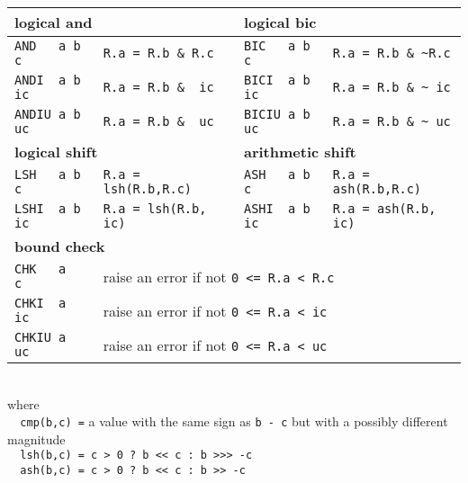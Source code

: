 \documentclass[10pt,a4paper]{article}
\begin{document}
\begin{tabular}{|l|l||l|l|}
\multicolumn{2}{|l||}{\bf logical and} & \multicolumn{2}{|l|}{\bf logical bic} \\ \hline
\verb#AND   a b  c# & \verb#R.a = R.b & R.c# &   \verb#BIC   a b  c# & \verb#R.a = R.b & ~R.c#   \\
\verb#ANDI  a b ic# & \verb#R.a = R.b &  ic# &   \verb#BICI  a b ic# & \verb#R.a = R.b & ~ ic#   \\
\verb#ANDIU a b uc# & \verb#R.a = R.b &  uc# &   \verb#BICIU a b uc# & \verb#R.a = R.b & ~ uc#   \\ \hline

\multicolumn{2}{|l||}{\bf logical shift} & \multicolumn{2}{|l|}{\bf arithmetic shift} \\ \hline
\verb#LSH   a b  c# & \verb#R.a = lsh(R.b,R.c) # & \verb#ASH   a b  c# & \verb#R.a = ash(R.b,R.c)#   \\
\verb#LSHI  a b ic# & \verb#R.a = lsh(R.b, ic) # & \verb#ASHI  a b ic# & \verb#R.a = ash(R.b, ic)#   \\
 \hline

\multicolumn{2}{|l||}{\bf bound check}  \\ \hline
\verb#CHK   a    c# & \multicolumn{3}{|l|}{raise an error if not  \texttt{0 <= R.a < R.c}}   \\
\verb#CHKI  a   ic# & \multicolumn{3}{|l|}{raise an error if not  \texttt{0 <= R.a <  ic}}   \\
\verb#CHKIU a   uc# & \multicolumn{3}{|l|}{raise an error if not  \texttt{0 <= R.a <  uc}}   \\
\hline

\end{tabular}

\noindent \verb## \\

\noindent where \\
\noindent
\verb#  cmp(b,c) =# a value with the same sign as \verb#b - c# but with a possibly different magnitude \\
\verb#  lsh(b,c) = c > 0 ? b << c : b >>> -c# \\
\verb#  ash(b,c) = c > 0 ? b << c : b >> -c#
\end{document}
